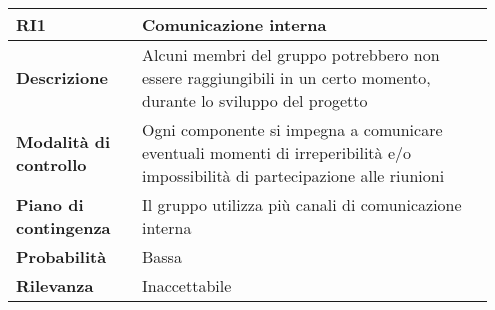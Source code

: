 \begin{table}[H]
    \bgroup
    \def\arraystretch{1.5}
    \begin{tabular} {
            | p{0.25\linewidth} | p{0.70\linewidth} |
        }
        \hline
        \textbf{RI1}                   & \textbf{Comunicazione interna}                                                                                                \\
        \hline
        \textbf{Descrizione}           & Alcuni membri del gruppo potrebbero non essere raggiungibili in un certo momento, durante lo sviluppo del progetto            \\
        \hline
        \textbf{Modalità di controllo} & Ogni componente si impegna a comunicare eventuali momenti di irreperibilità e/o impossibilità di partecipazione alle riunioni \\
        \hline
        \textbf{Piano di contingenza}  & Il gruppo utilizza più canali di comunicazione interna                                                                        \\
        \hline
        \textbf{Probabilità}           & Bassa                                                                                                                         \\
        \hline
        \textbf{Rilevanza}             & Inaccettabile                                                                                                                 \\
        \hline
    \end{tabular}
    \egroup
\end{table}

